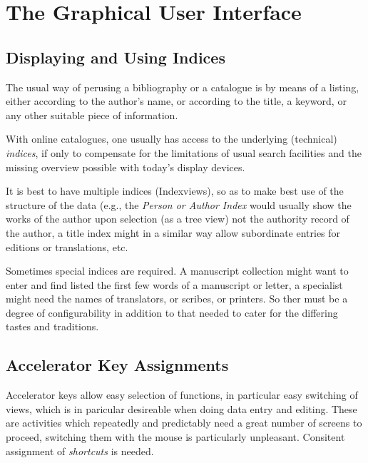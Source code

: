 \section{The Graphical User Interface}
\label{sec:gui}



\subsection{Displaying and Using Indices}
\label{sec:guiindex}


The usual way of perusing a bibliography or a catalogue is by means of
a listing, either according to the author's name, or according to the
title, a keyword, or any other suitable piece of information. 

With online catalogues, one usually has access to the underlying
(technical) \textit{indices}, if only to compensate for the
limitations of usual search facilities and the missing overview
possible with today's display devices. 

It is best to have multiple indices (Indexviews), so as to make best
use of the structure of the data (e.g., the \textit{Person or Author
  Index} would usually show the works of the author upon selection (as
a tree view) not the authority record of the author, a title index
might in a similar way allow subordinate entries for editions or
translations, etc. 

Sometimes special indices are required. A manuscript collection might
want to enter and find listed the first few words of a manuscript or
letter, a specialist might need the names of translators, or scribes,
or printers. So ther must be a degree of configurability in addition
to that needed to cater for the differing tastes and traditions.

\subsection{Accelerator Key Assignments}
\label{sec:keys}

Accelerator keys allow easy selection of functions, in particular easy
switching of views, which is in paricular desireable when doing data
entry and editing. These are activities which repeatedly and
predictably need a great number of screens to proceed, switching them
with the mouse is particularly unpleasant. 
Consitent assignment of \textit{shortcuts} is needed.



